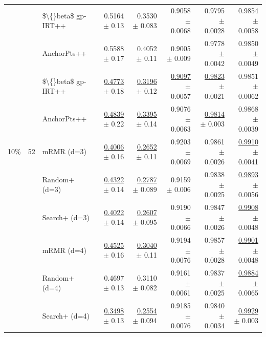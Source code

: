 \begin{longtable}{llp{}rrrrr}
 &  & \$\textbackslash\{\}beta\$ gp-IRT++ & 0.5164 {\scriptsize $\pm$ 0.13} & 0.3530 {\scriptsize $\pm$ 0.083} & 0.9058 {\scriptsize $\pm$ 0.0068} & 0.9795 {\scriptsize $\pm$ 0.0028} & 0.9854 {\scriptsize $\pm$ 0.0058} \\
 &  & AnchorPts++ & 0.5588 {\scriptsize $\pm$ 0.17} & 0.4052 {\scriptsize $\pm$ 0.11} & 0.9005 {\scriptsize $\pm$ 0.009} & 0.9778 {\scriptsize $\pm$ 0.0042} & 0.9850 {\scriptsize $\pm$ 0.0049} \\
 &  & \$\textbackslash\{\}beta\$ gp-IRT++ & \underline{0.4773} {\scriptsize $\pm$ 0.18} & \underline{0.3196} {\scriptsize $\pm$ 0.12} & \underline{0.9097} {\scriptsize $\pm$ 0.0057} & \underline{0.9823} {\scriptsize $\pm$ 0.0021} & 0.9851 {\scriptsize $\pm$ 0.0062} \\
 &  & AnchorPts++ & \underline{0.4839} {\scriptsize $\pm$ 0.22} & \underline{0.3395} {\scriptsize $\pm$ 0.14} & 0.9076 {\scriptsize $\pm$ 0.0063} & \underline{0.9814} {\scriptsize $\pm$ 0.003} & 0.9868 {\scriptsize $\pm$ 0.0039} \\
\midrule
10\% & 52 & mRMR (d=3) & \underline{0.4006} {\scriptsize $\pm$ 0.16} & \underline{0.2652} {\scriptsize $\pm$ 0.11} & 0.9203 {\scriptsize $\pm$ 0.0069} & 0.9861 {\scriptsize $\pm$ 0.0026} & \underline{0.9910} {\scriptsize $\pm$ 0.0041} \\
 &  & Random+ (d=3) & \underline{0.4322} {\scriptsize $\pm$ 0.14} & \underline{0.2787} {\scriptsize $\pm$ 0.089} & 0.9159 {\scriptsize $\pm$ 0.006} & 0.9838 {\scriptsize $\pm$ 0.0025} & \underline{0.9893} {\scriptsize $\pm$ 0.0056} \\
 &  & Search+ (d=3) & \underline{0.4022} {\scriptsize $\pm$ 0.14} & \underline{0.2607} {\scriptsize $\pm$ 0.095} & 0.9190 {\scriptsize $\pm$ 0.0066} & 0.9847 {\scriptsize $\pm$ 0.0026} & \underline{0.9908} {\scriptsize $\pm$ 0.0048} \\
 &  & mRMR (d=4) & \underline{0.4525} {\scriptsize $\pm$ 0.16} & \underline{0.3040} {\scriptsize $\pm$ 0.11} & 0.9194 {\scriptsize $\pm$ 0.0076} & 0.9857 {\scriptsize $\pm$ 0.0028} & \underline{0.9901} {\scriptsize $\pm$ 0.0048} \\
 &  & Random+ (d=4) & 0.4697 {\scriptsize $\pm$ 0.13} & 0.3110 {\scriptsize $\pm$ 0.082} & 0.9161 {\scriptsize $\pm$ 0.0061} & 0.9837 {\scriptsize $\pm$ 0.0025} & \underline{0.9884} {\scriptsize $\pm$ 0.0065} \\
 &  & Search+ (d=4) & \underline{0.3498} {\scriptsize $\pm$ 0.13} & \underline{0.2554} {\scriptsize $\pm$ 0.094} & 0.9185 {\scriptsize $\pm$ 0.0076} & 0.9840 {\scriptsize $\pm$ 0.0034} & \underline{0.9929} {\scriptsize $\pm$ 0.003} \\

\end{longtable}
